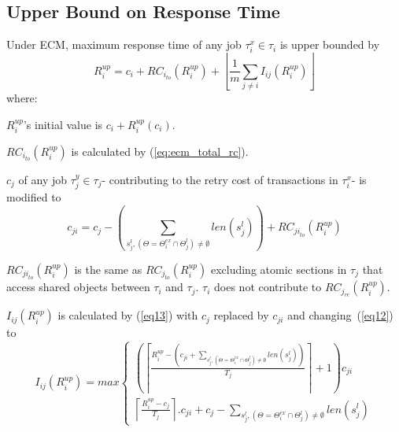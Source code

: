 \subsection{Upper Bound on Response Time}
%
\begin{clm}\label{clm:ecm_response_time_upper_bound}
%
Under ECM, maximum response time of any job $\tau_i^x \in \tau_i$ is upper bounded by 
%
\begin{equation}
R_{i}^{up}=c_{i}+RC_{i_{to}}(R_i^{up})+\left\lfloor\frac{1}{m}\sum_{j\ne i}I_{ij}(R_{i}^{up})\right\rfloor
\label{eq10}
\end{equation}
%
where:
\begin{compactitem}
\item $R_{i}^{up}$'s initial value is $c_i + R_i^{up}(c_i)$.
\item $RC_{i_{to}}(R_i^{up})$ is calculated by (\ref{eq:ecm_total_rc}).
\item $c_j$ of any job $\tau_j^y \in \tau_j$- contributing to the retry cost of transactions in $\tau_i^x$- is modified to 
\begin{equation}
c_{ji}=c_{j}-\left(\sum_{s_j^l,\left(\Theta=\Theta_i^{ex} \cap \Theta_j^l\right)\neq \emptyset}len \left(s_j^l \right) \right)+RC_{{ji}_{to}}(R_i^{up})\label{eq9}\end{equation}
\item $RC_{{ji}_{to}}(R_i^{up})$ is the same as $RC_{j_{to}}(R_i^{up})$ excluding atomic sections in $\tau_j$ that access shared objects between $\tau_i$ and $\tau_j$. $\tau_i$ does not contribute to $RC_{j_{re}}(R_i^{up})$.
\item $I_{ij}(R_{i}^{up})$ is calculated by (\ref{eq13}) with $c_{j}$ replaced by 
$c_{ji}$ and changing~(\ref{eq12}) to 
\begin{equation}
I_{ij}(R_i^{up})=max\begin{cases}
\left(\left\lceil\frac{R_i^{up}-\left(c_{ji}+\sum_{s_j^l,\left(\Theta=\Theta_i^{ex} \cap \Theta_j^l\right)\neq \emptyset} len(s_j^l)\right)}{T_{j}}\right\rceil+1 \right)c_{ji}\\
\left\lceil\frac{R_i^{up}-c_{j}}{T_{j}}\right\rceil.c_{ji}+c_{j}-\sum_{s_j^l,\left(\Theta=\Theta_i^{ex} \cap \Theta_j^l\right)\neq \emptyset} {len(s_j^l)}\end{cases}\label{eq14}\end{equation}
\end{compactitem}
%
\end{clm}
%
